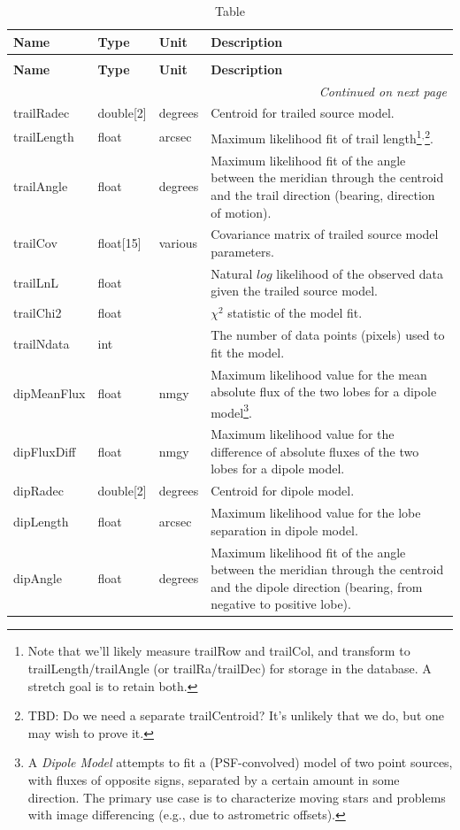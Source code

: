 \documentclass[SE,lsstdraft,toc]{lsstdoc}
\newenvironment{schema}[3]{%
\setlength\LTleft{0pt}
\setlength\LTright{\fill}
\begin{longtable}{p{0.2\textwidth}p{0.14\textwidth}p{0.14\textwidth}p{0.41\textwidth}}

\caption[#1]{#2\label{#3}}\\

\hline \textbf{Name} & \textbf{Type} & \textbf{Unit} & \textbf{Description}\\ \hline
\endfirsthead

\caption[#1]{#2}\\

\hline \textbf{Name} & \textbf{Type} & \textbf{Unit} & \textbf{Description}\\ \hline
\endhead

\hline \multicolumn{4}{r}{\emph{Continued on next page}} \\
\endfoot

\hline\hline
\endlastfoot
}{%
\hline
\end{longtable}
}
\begin{document}
\begin{schema}{\DIASource Table}{\DIASource Table}{tbl:diasourceTable}
trailRadec & double[2] & degrees & Centroid for trailed source model. \\

trailLength & float & arcsec & Maximum likelihood fit of trail length\footnote{Note that we'll likely measure trailRow and trailCol, and transform to trailLength/trailAngle (or trailRa/trailDec) for storage in the database. A stretch goal is to retain both.}$^,$\footnote{TBD: Do we need a separate trailCentroid? It's unlikely that we do, but one may wish to prove it.}. \\

trailAngle & float & degrees & Maximum likelihood fit of the angle between the meridian through the centroid and the trail direction (bearing, direction of motion). \\

trailCov & float[15] & various & Covariance matrix of trailed source model parameters. \\

trailLnL & float & ~ & Natural $log$ likelihood of the observed data given the trailed source model. \\

trailChi2 & float & ~ & $\chi^2$ statistic of the model fit. \\

trailNdata & int & ~ & The number of data points (pixels) used to fit the model. \\

dipMeanFlux & float & nmgy & Maximum likelihood value for the mean absolute flux of the two lobes for a dipole model\footnote{A \emph{Dipole Model} attempts to fit a (PSF-convolved) model of two point sources, with fluxes
of opposite signs, separated by a certain amount in some direction. The primary use case is to characterize moving stars and problems with image differencing (e.g., due to astrometric offsets).}.
\\

dipFluxDiff & float & nmgy & Maximum likelihood value for the difference of absolute fluxes of the two lobes for a dipole model.
\\

dipRadec & double[2] & degrees & Centroid for dipole model. \\

dipLength & float & arcsec & Maximum likelihood value for the lobe separation in dipole model. \\

dipAngle & float & degrees & Maximum likelihood fit of the angle between the meridian through the centroid and the dipole direction (bearing, from negative to positive lobe). \\


\end{schema}
\end{document}

